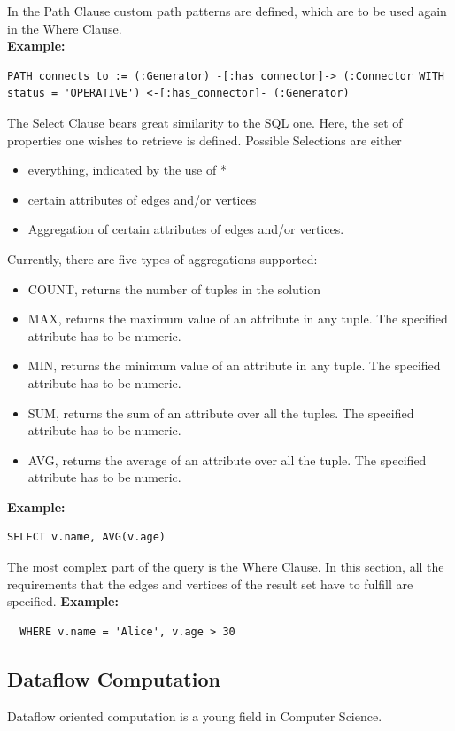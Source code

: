 \documentclass[11pt,singlecolumn]{scrartcl}
\begin{document}
In the Path Clause custom path patterns are defined, which are to be used again in the Where Clause.\\
\textbf{Example:}\\
\begin{lstlisting}
PATH connects_to := (:Generator) -[:has_connector]-> (:Connector WITH status = 'OPERATIVE') <-[:has_connector]- (:Generator)
 \end{lstlisting}
The Select Clause bears great similarity to the SQL one. Here, the set of properties one wishes to retrieve is defined. Possible Selections are either\\
\begin{itemize} 
\item everything, indicated by the use of * 
\item certain attributes of edges and/or vertices
\item Aggregation of certain attributes of edges and/or vertices.
\end{itemize}
 Currently, there are five types of aggregations supported:\\
 \begin{itemize} 
\item COUNT, returns the number of tuples in the solution 
\item MAX, returns the maximum value of an attribute in any tuple. The specified attribute has to be numeric.
\item MIN, returns the minimum value of an attribute in any tuple. The specified attribute has to be numeric.
\item SUM, returns the sum of an attribute over all the tuples. The specified attribute has to be numeric.
\item AVG, returns the average of an attribute over all the tuple. The specified attribute has to be numeric.
\end{itemize}
\textbf{Example:}\\
\begin{lstlisting}
SELECT v.name, AVG(v.age)
 \end{lstlisting} 
The most complex part of the query is the Where Clause. In this section, all the requirements that the edges and vertices of the result set have to fulfill are specified.
\textbf{Example:}\\
\begin{verbatim}
  WHERE v.name = 'Alice', v.age > 30
\end{verbatim}

\clearpage
\subsection{Dataflow Computation}
Dataflow oriented computation is a young field in Computer Science.
\end{document}

